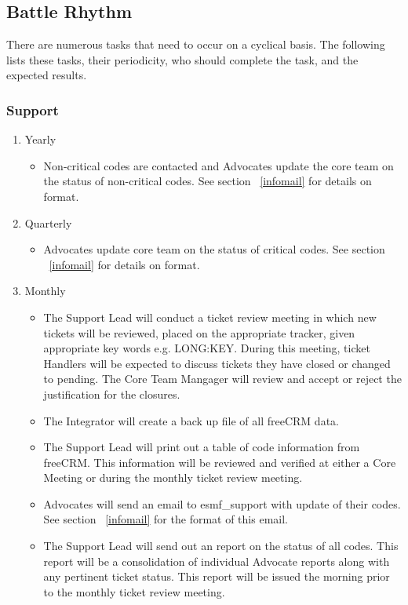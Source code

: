 \begin{enumerate}
\subsection{Battle Rhythm}
\label{battle}
There are numerous tasks that need to occur on a cyclical basis. The following lists these tasks, their periodicity, who should complete the task, and the expected results.

\subsubsection{Support}
\begin{enumerate}

\item Yearly
 \begin{itemize}
 \item Non-critical codes are contacted and Advocates update the core team on the status of non-critical codes. See section ~\ref{infomail} for details on format.
 \end{itemize}

\item Quarterly
 \begin{itemize}
 \item Advocates update core team on the status of critical codes. See section ~\ref{infomail} for details on format.
 \end{itemize}

\item Monthly
  \begin{itemize}
  \item The Support Lead will conduct a ticket review meeting in which new tickets will be reviewed, placed on the appropriate tracker, given appropriate key words e.g. LONG:KEY. During this meeting, ticket Handlers will be expected to discuss tickets they have closed or changed to pending. The Core Team Mangager will review and accept or reject the justification for the closures.
   \item The Integrator will create a back up file of all freeCRM data.
   \item The Support Lead will print out a table of code information from freeCRM. This information will be reviewed and verified at either a Core Meeting or during the monthly ticket review meeting. 
   \item Advocates will send an email to esmf\_support with update of their codes. See section ~\ref{infomail} for the format of this email.
   \item The Support Lead will send out an report on the status of all codes. This report will be a consolidation of individual Advocate reports along with any pertinent ticket status. This report will be issued the morning prior to the monthly ticket review meeting. 
  \end{itemize}


\end{enumerate}
\end{enumerate}
